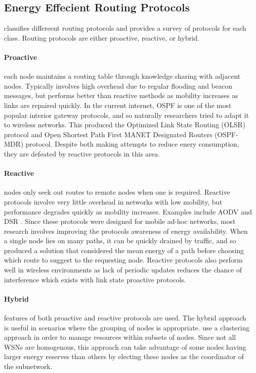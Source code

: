 \documentclass[12pt]{article}
\begin{document}
\subsection{Energy Effecient Routing Protocols}

\cite{hassan} classifies differeent routing protocols and provides a survey of protocols for each class. Routing protocols are either proactive, reactive, or hybrid. 

\paragraph{Proactive} each node maintains a routing table through knowledge sharing with adjacent nodes. Typically involves high overhead due to regular flooding and beacon messages, but performs better than reactive methods as mobility increases as links are repaired quickly. In the current internet, OSPF is one of the most popular interior gateway protocols, and so naturally researchers tried to adapt it to wireless networks. This produced the Optimized Link State Routing (OLSR) protocol \cite{olsr} and Open Shortest Path First MANET Designated Routers (OSPF-MDR) protocol. Despite both making attempts to reduce enery consumption, they are defeated by reactive protocols in this area.

\paragraph{Reactive} nodes only seek out routes to remote nodes when one is required. Reactive protocols involve very little overhead in networks with low mobility, but performance degrades quickly as mobility increases. Examples include AODV \cite{aodv} and DSR \cite{dsr}. Since these protocols were designed for mobile ad-hoc networks, most research involves improving the protocols awareness of energy availability. When a single node lies on many paths, it can be quickly drained by traffic, and so \cite{eaodv} produced a solution that considered the mean energy of a path before choosing which route to suggest to the requesting node. 
Reactive protocols also perform well in wireless environments as lack of periodic updates reduces the chance of interference which exists with link state proactive protocols.

\paragraph{Hybrid} features of both proactive and reactive protocols are used. The hybrid approach is useful in scenarios where the grouping of nodes is appropriate. \cite{cluster} use a clustering approach in order to manage resources within subsets of nodes. Since not all WSNs are homogenous, this approach can take advantage of some nodes having larger energy reserves than others by electing these nodes as the coordinator of the subnetwork.
\end{document}
